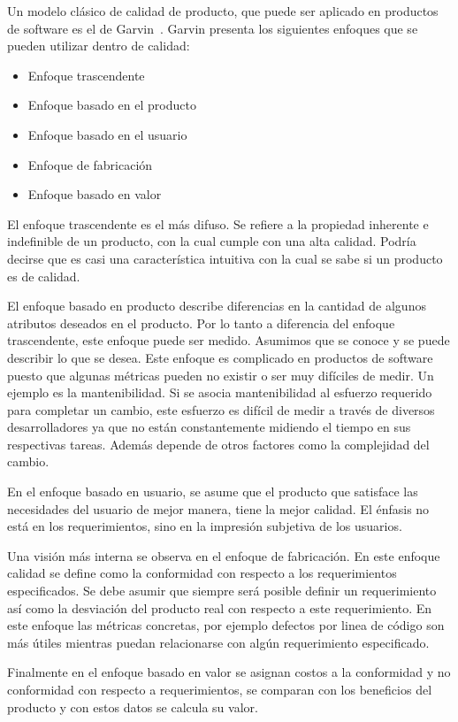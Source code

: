 Un modelo clásico de calidad de producto, que puede ser aplicado en productos
de software es el de Garvin~\cite{Garvin:1984}. Garvin presenta los siguientes
enfoques que se pueden utilizar dentro de calidad:
\begin{itemize}
    \item Enfoque trascendente
    \item Enfoque basado en el producto
    \item Enfoque basado en el usuario
    \item Enfoque de fabricación
    \item Enfoque basado en valor
\end{itemize}

El enfoque trascendente es el más difuso. Se refiere a la propiedad inherente
e indefinible de un producto, con la cual cumple con una alta calidad. Podría
decirse que es casi una característica intuitiva con la cual se sabe si un
producto es de calidad.

El enfoque basado en producto describe diferencias en la cantidad de algunos
atributos deseados en el producto. Por lo tanto a diferencia del enfoque
trascendente, este enfoque puede ser medido. Asumimos que se conoce
y se puede describir lo que se desea.
Este enfoque es complicado en productos de software puesto que algunas métricas
pueden no existir o ser muy difíciles de medir. Un ejemplo es la mantenibilidad.
Si se asocia mantenibilidad al esfuerzo requerido para completar un cambio, este
esfuerzo es difícil de medir a través de diversos desarrolladores ya que no están
constantemente midiendo el tiempo en sus respectivas tareas. Además depende de 
otros factores como la complejidad del cambio.

En el enfoque basado en usuario, se asume que el producto que satisface
las necesidades del usuario de mejor manera, tiene la mejor calidad. El énfasis
no está en los requerimientos, sino en la impresión subjetiva de los usuarios.

Una visión más interna se observa en el enfoque de fabricación. En este enfoque
calidad se define como la conformidad con respecto a los requerimientos especificados.
Se debe asumir que siempre será posible definir un requerimiento así como la desviación
del producto real con respecto a este requerimiento. En este enfoque las métricas
concretas, por ejemplo defectos por linea de código son más útiles mientras puedan
relacionarse con algún requerimiento especificado.

Finalmente en el enfoque basado en valor se asignan costos a la conformidad y no
conformidad con respecto a requerimientos, se comparan con los beneficios del
producto y con estos datos se calcula su valor.

